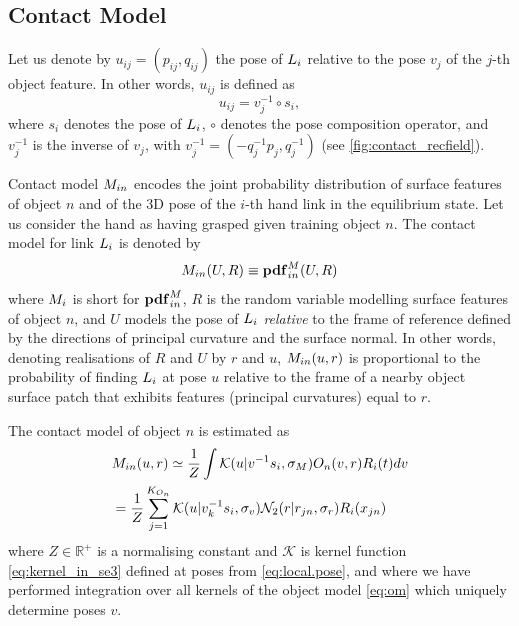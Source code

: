 \subsection{Contact Model}\label{sec:contact.model}

Let us denote by $u_{ij} = (p_{ij}, q_{ij})$ the pose of $L_i$ relative to the pose $v_j$ of the $j$-th object feature. In other words, $u_{ij}$ is defined as
\begin{equation}
u_{ij} = v_j^{-1} \circ s_i,
\label{eq:local.pose}
\end{equation}
where $s_i$ denotes the pose of $L_i$, $\circ$ denotes the pose composition operator, and $v_j^{-1}$ is the inverse of $v_j$, with $v_j^{-1} = (-q_j^{-1}p_j, q_j^{-1})$ (see \fig\ref{fig:contact_recfield}). 

Contact model $M_{in}$ encodes the joint probability distribution of surface features of object $n$ and of the 3D pose of the $i$-th hand link in the equilibrium state. Let us consider the hand as having grasped given training object $n$. The contact model for link $L_i$ is denoted by
\begin{equation}\label{eq:M}
M_{in}(U, R) \equiv \mathbf{pdf}^M_{in}(U, R)
\end{equation}
where $M_i$ is short for $\mathbf{pdf}^M_{in}$, $R$ is the random variable modelling surface features of object $n$, and $U$ models the pose of $L_i$ \emph{relative} to the frame of reference defined by the directions of principal curvature and the surface normal. In other words, denoting realisations of $R$ and $U$ by $r$ and $u$, $M_{in}(u, r)$ is proportional to the probability of finding $L_i$ at pose $u$ relative to the frame of a nearby object surface patch that exhibits features (principal curvatures) equal to $r$.

The contact model of object $n$ is estimated as
\begin{equation}\label{eq:cm_n}
\begin{split}
&M_{in}(u, r) \simeq \frac 1Z \int \mathcal{K}(u|v^{-1}s_i, \sigma_M) O_{n}(v, r) R_{i}(t) dv\\
&= \frac 1Z \sum_{j=1}^{K_{O_n}} \mathcal{K}(u|v_k^{-1}s_i, \sigma_v) \mathcal{N}_2({r}| r_{jn}, \sigma_r) R_{i}(x_{jn})
\end{split}
\end{equation}
where $Z \in \mathbb R^+$ is a normalising constant and $\mathcal{K}$ is kernel function \eqref{eq:kernel_in_se3} defined at poses from \eq\eqref{eq:local.pose}, and where we have performed integration over all kernels of the object model \eqref{eq:om} which uniquely determine poses $v$.

